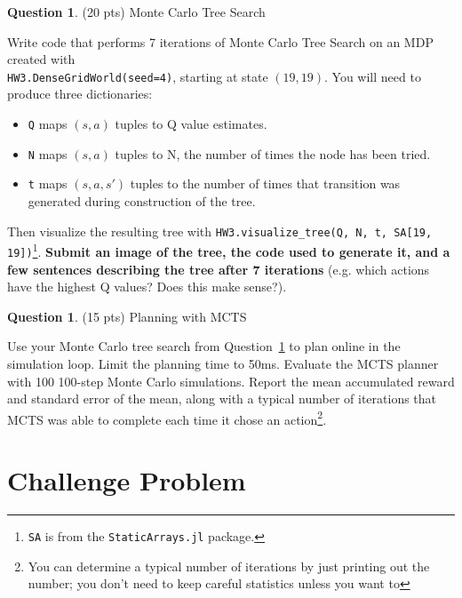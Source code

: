 \documentclass{article}
\theoremstyle{definition}
\newtheorem{question}[thm]{Question}
\begin{document}
\begin{question} \label{q:mcts} (20 pts) Monte Carlo Tree Search
    
    Write code that performs 7 iterations of Monte Carlo Tree Search on an MDP created with \\
    \texttt{HW3.DenseGridWorld(seed=4)},
    starting at state $(19, 19)$. You will need to produce three dictionaries:
    \begin{itemize}[noitemsep]
        \item \texttt{Q} maps $(s, a)$ tuples to Q value estimates.
        \item \texttt{N} maps $(s, a)$ tuples to N, the number of times the node has been tried.
        \item \texttt{t} maps $(s, a, s')$ tuples to the number of times that transition was generated during construction of the tree.
    \end{itemize}
    Then visualize the resulting tree with \texttt{HW3.visualize\_tree(Q, N, t, SA[19, 19])}\footnote{\texttt{SA} is from the \texttt{StaticArrays.jl} package.}. \textbf{Submit an image of the tree, the code used to generate it, and a few sentences describing the tree after 7 iterations} (e.g. which actions have the highest Q values? Does this make sense?).
    
\end{question}

\begin{question}
    (15 pts) Planning with MCTS

    Use your Monte Carlo tree search from Question~\ref{q:mcts} to plan online in the simulation loop. Limit the planning time to 50ms. Evaluate the MCTS planner with 100 100-step Monte Carlo simulations. Report the mean accumulated reward and standard error of the mean, along with a typical number of iterations that MCTS was able to complete each time it chose an action\footnote{You can determine a typical number of iterations by just printing out the number; you don't need to keep careful statistics unless you want to}.
\end{question}

\section{Challenge Problem}
\end{document}
